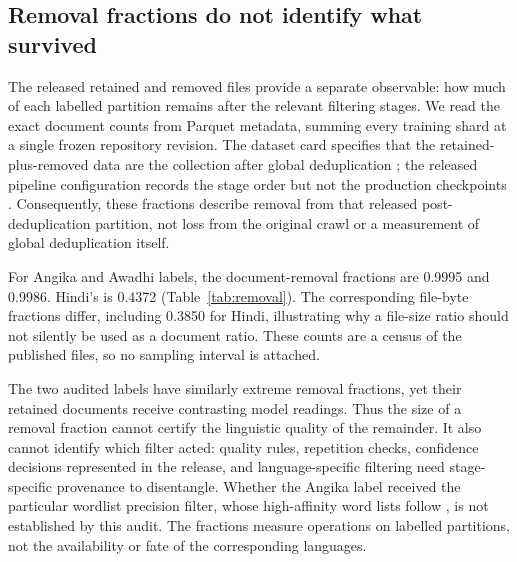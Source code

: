 \documentclass[final]{clv2025}
\newcommand{\fitexhibit}[1]{\sbox{\exhibitbox}{}\ifdim\wd\exhibitbox>\linewidth\resizebox{\linewidth}{!}{\usebox{\exhibitbox}}\else\usebox{\exhibitbox}\fi}
\newcommand{\exhibit}[1]{\fitexhibit{tables/#1.tex}}
\begin{document}
\subsection{Removal fractions do not identify what survived}\label{sec:removal}

The released retained and removed files provide a separate observable: how much of each labelled partition remains after the relevant filtering stages. We read the exact document counts from Parquet metadata, summing every training shard at a single frozen repository revision. The dataset card specifies that the retained-plus-removed data are the collection after global deduplication \citep{fineweb2-dataset}; the released pipeline configuration records the stage order but not the production checkpoints \citep{finewebpipeline}. Consequently, these fractions describe removal from that released post-deduplication partition, not loss from the original crawl or a measurement of global deduplication itself.

\begin{table}[tb]
\centering\small
\exhibit{removal_counts}
\caption{Complete retained and removed training-shard counts at the frozen FineWeb-2 revision. Fractions are removed divided by retained plus removed. File-byte fractions use stored Parquet sizes, including compression and metadata; they are not fractions of uncompressed linguistic text. Neither fraction isolates a particular filter.}
\label{tab:removal}
\end{table}

For Angika and Awadhi labels, the document-removal fractions are 0.9995 and 0.9986. Hindi's is 0.4372 (Table~\ref{tab:removal}). The corresponding file-byte fractions differ, including 0.3850 for Hindi, illustrating why a file-size ratio should not silently be used as a document ratio. These counts are a census of the published files, so no sampling interval is attached.

The two audited labels have similarly extreme removal fractions, yet their retained documents receive contrasting model readings. Thus the size of a removal fraction cannot certify the linguistic quality of the remainder. It also cannot identify which filter acted: quality rules, repetition checks, confidence decisions represented in the release, and language-specific filtering need stage-specific provenance to disentangle. Whether the Angika label received the particular wordlist precision filter, whose high-affinity word lists follow \citet{bapna2022building}, is not established by this audit. The fractions measure operations on labelled partitions, not the availability or fate of the corresponding languages.
\end{document}
